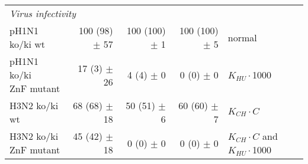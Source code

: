 \begin{landscape}
\begin{longtable}{@{}lrrrl@{}}
\midrule
\multicolumn{5}{l}{\textit{Virus infectivity}}\\
pH1N1 ko/ki wt &
100 (98) $\pm$ 57 &
100 (100) $\pm$ 1 &
100 (100) $\pm$ 5 &
normal\\
\makecell[l]{pH1N1 ko/ki\\ZnF mutant} &
17 (3) $\pm$ 26 &
4 (4) $\pm$ 0 &
0 (0) $\pm$ 0 &
$K_{HU} \cdot$1000\\
H3N2 ko/ki wt &
68 (68) $\pm$ 18 &
50 (51) $\pm$ 6 &
60 (60) $\pm$ 7 &
$K_{CH} \cdot C$\\
\makecell[l]{H3N2 ko/ki\\ZnF mutant} &
45 (42) $\pm$ 18 &
0 (0) $\pm$ 0 &
0 (0) $\pm$ 0 &
$K_{CH} \cdot C$ and $K_{HU} \cdot$1000 \\
\bottomrule
\end{longtable}

\end{landscape}
